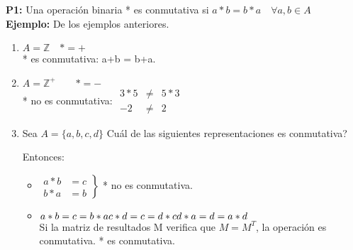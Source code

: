 \textbf{P1: }Una operación binaria * es conmutativa si $a*b=b*a \quad \forall a,b \in A$\\
\textbf{Ejemplo: }De los ejemplos anteriores.
\begin{enumerate}
\item $A=\mathds{Z}\quad *=+$\\
		* es conmutativa: a+b = b+a.
\item $A=\mathds{Z}^+ \quad \quad *=-$\\
		* no es conmutativa: $\begin{array}{rll}3*5&\not=&5*3 \\ -2&\not=&2\end{array}$
\item Sea $A=\lbrace a,b,c,d\rbrace$ Cuál de las siguientes representaciones es conmutativa?
\begin{center}
\end{center}

Entonces:
\begin{itemize}
\item $\left.\begin{matrix} a*b & =c \\ b*a & =b \end{matrix}\right\}$ * no es conmutativa.

\item $a*b=c=b*a\\ c*d=c=d*c \\ d*a=d=a*d$\\ Si la matriz de resultados M verifica que $M=M^T$, la operación es conmutativa. * es conmutativa.

\end{itemize}
\end{enumerate}

